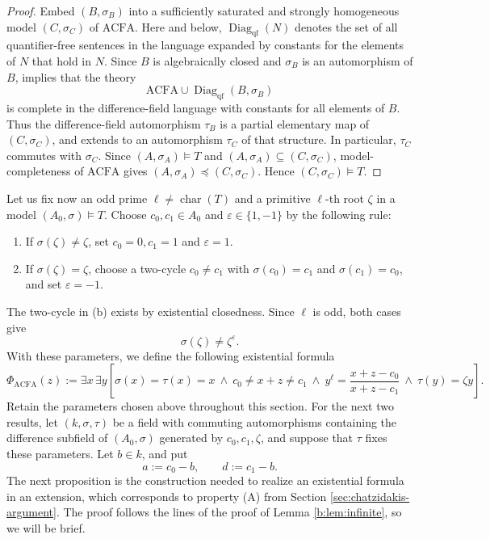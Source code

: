 \documentclass[10pt,a4paper]{amsart}
\theoremstyle{definition}
\DeclareMathOperator{\charac}{char}
\newcommand{\ACFA}{\mathrm{ACFA}}
\begin{document}
\begin{proof}
Embed $(B,\sigma_B)$ into a sufficiently saturated and strongly homogeneous model $(C,\sigma_C)$ of $\ACFA$. Here and below, $\operatorname{Diag}_{\mathrm{qf}}(N)$ denotes
the set of all quantifier-free sentences in the language
expanded by constants for the elements of $N$ that hold in $N$. Since $B$ is algebraically closed and $\sigma_B$ is an
automorphism of $B$, \cite[Theorem~1.3, p.~3008]{CH}
implies that the theory
\[
\ACFA\cup\operatorname{Diag}_{\mathrm{qf}}(B,\sigma_B)
\]
is complete in the difference-field language with constants
for all elements of $B$. Thus the difference-field automorphism $\tau_B$ is a partial elementary map of $(C,\sigma_C)$, and extends to an automorphism $\tau_C$ of that structure. In particular, $\tau_C$ commutes with $\sigma_C$. Since $(A,\sigma_A)\models T$ and
$(A,\sigma_A)\subseteq(C,\sigma_C)$, model-completeness of
$\ACFA$ gives
$(A,\sigma_A)\preccurlyeq(C,\sigma_C)$.
Hence $(C,\sigma_C)\models T$.
 \end{proof}
Let us fix now an odd prime $\ell\neq\charac(T)$ and a primitive $\ell$-th root $\zeta$ in a model $(A_0,\sigma)\models T$. Choose $c_0,c_1\in A_0$ and $\varepsilon\in\{1,-1\}$ by the following rule:
\begin{enumerate}[label=\textup{(\alph*)}]
\item If $\sigma(\zeta)\neq\zeta$, set $c_0=0,c_1=1$ and $\varepsilon=1$.
\item If $\sigma(\zeta)=\zeta$, choose a two-cycle $c_0\neq c_1$ with $\sigma(c_0)=c_1$ and $\sigma(c_1)=c_0$, and set $\varepsilon=-1$.
\end{enumerate}
The two-cycle in (b) exists by existential closedness. Since $\ell$ is odd, both cases give
\begin{equation}\label{a:eq:mismatch}
 \sigma(\zeta)\neq\zeta^\varepsilon.
\end{equation}
With these parameters, we define the following existential formula
\[
\Phi_{\mathrm{ACFA}}(z):=\exists x\,\exists y
 \left[
 \sigma(x)=\tau(x)=x\ \wedge\
 c_0\neq x+z\neq c_1\ \wedge\
 y^\ell=\frac{x+z-c_0}{x+z-c_1}\ \wedge\
 \tau(y)=\zeta y\right].
\]
Retain the parameters chosen above throughout this section.
For the next two results, let $(k,\sigma,\tau)$ be a field with commuting automorphisms
containing the difference subfield of $(A_0,\sigma)$ generated
by $c_0,c_1,\zeta$, and suppose that $\tau$ fixes these parameters.
Let $b\in k$, and put
\[
a:=c_0-b,\qquad d:=c_1-b.
\]
The next proposition is the construction needed to realize an existential formula in an extension, which corresponds to property (A) from Section \ref{sec:chatzidakis-argument}. The proof follows the lines of the proof of Lemma \ref{b:lem:infinite}, so we will be brief.
\end{document}
